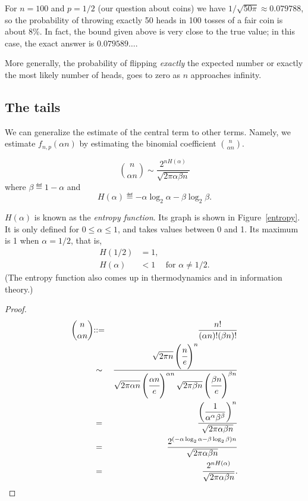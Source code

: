 \documentclass[11pt,twoside]{article}
\begin{document}
For $n=100$ and $p=1/2$ (our question about coins) we have $1/\sqrt{50 \pi}
\approx 0.079788$, so the probability of throwing exactly 50 heads in 100
tosses of a fair coin is about 8\%.  In fact, the bound given above is very
close to the true value; in this case, the exact answer is
$0.079589\dots$.

More generally, the probability of flipping \emph{exactly} the expected
number or exactly the most likely number of heads, goes to zero as $n$
approaches infinity.


\subsection{The tails}

We can generalize the estimate of the central term to other terms.
Namely, we estimate $f_{n,p}(\alpha n)$ by estimating the binomial
coefficient $\binom{n}{\alpha n}$.
\begin{lemma*}
\begin{equation}\label{binom-est}
\binom{n}{\alpha n} \sim \frac{2^{nH(\alpha)}}{\sqrt{2\pi \alpha\beta n}}
\end{equation}
where $\beta \eqdef 1 - \alpha$ and
\[
H(\alpha) \eqdef - \alpha\log_2 \alpha - \beta \log_2 \beta .
\]
\end{lemma*}

$H(\alpha)$ is known as the \emph{entropy function}.  Its graph is
shown in Figure~\ref{entropy}.  It is only defined for $0 \le \alpha \le
1$, and takes values between 0 and 1.  Its maximum is 1 when $\alpha =
1/2$, that is,
\begin{align*}
H(1/2) & = 1,\\
H(\alpha) & < 1 &\text{for }\alpha \neq 1/2.
\end{align*}
(The entropy function also comes up in thermodynamics and in information
theory.)

\begin{proof}

\begin{eqnarray*}
\binom{n}{\alpha n} &\mathbin{::=}& \frac{n!}{(\alpha n)!(\beta  n)!}\\ 
  &\sim& \frac{\sqrt{2\pi n}\left(\cfrac{n}{e}\right)^n}
         {\sqrt{2\pi \alpha n}\left(\cfrac{\alpha n}{e}\right)^{\alpha n}
          \sqrt{2\pi \beta  n}\left(\cfrac{\beta  n}{e}\right)^{\beta n}}\\
&=& \frac{\left(\dfrac{1}{\alpha^\alpha\beta ^{\beta }}\right)^n}{\sqrt{2\pi \alpha\beta n}} \\
 &=&    \frac{2^{(-\alpha\log_2 \alpha-\beta \log_2 \beta )n}}{\sqrt{2\pi \alpha\beta n}} \\
  &=& \frac{2^{nH(\alpha)}}{\sqrt{2\pi \alpha\beta n}}.
\end{eqnarray*}
\end{proof}
\end{document}
